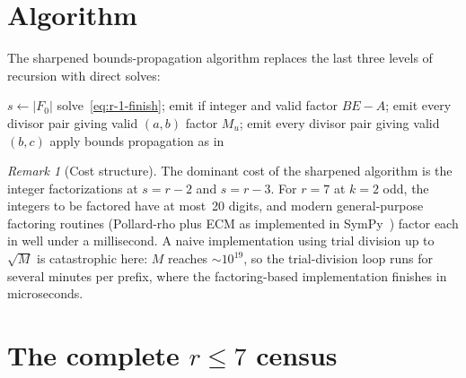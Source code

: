 \documentclass[11pt]{article}
\theoremstyle{definition}
\theoremstyle{remark}
\newtheorem{remark}[theorem]{Remark}
\begin{document}
\section{Algorithm}

The sharpened bounds-propagation algorithm replaces the last three
levels of recursion with direct solves:

\begin{algorithm}[H]
\caption{Sharpened bounds propagation for $k$-Lehmer enumeration}
\label{alg:sharp}
\begin{algorithmic}[1]
\State $s \gets |F_0|$
    \State solve~\eqref{eq:r-1-finish}; emit if integer and valid
    \State factor $BE - A$; emit every divisor pair giving valid $(a, b)$
        \State factor $M_u$; emit every divisor pair giving valid $(b, c)$
    \EndFor
\Else
    \State apply bounds propagation as in~\cite{MS26}
        \State {}
    \EndFor
\EndIf
\EndProcedure
\end{algorithmic}
\end{algorithm}

\begin{remark}[Cost structure]
The dominant cost of the sharpened algorithm is the integer
factorizations at $s = r - 2$ and $s = r - 3$. For $r = 7$ at $k = 2$
odd, the integers to be factored have at most~20 digits, and modern
general-purpose factoring routines (Pollard-rho plus ECM as
implemented in SymPy~\cite{sympy}) factor each in well under a
millisecond.  A naive implementation using trial division up to
$\sqrt{M}$ is catastrophic here: $M$ reaches $\sim 10^{19}$, so the
trial-division loop runs for several minutes per prefix, where the
factoring-based implementation finishes in microseconds.
\end{remark}


\section{The complete $r \le 7$ census}\label{sec:census}
\end{document}
